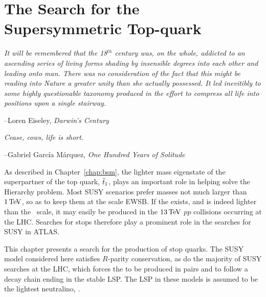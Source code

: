 \chapter{The Search for the Supersymmetric Top-quark}
\label{chap:search_stop}

\epigraph{
\textit{It will be remembered that the 18$^{th}$ century was, on the whole,
addicted to an ascending series of living forms shading by insensible degrees
into each other and leading onto man.
There was no consideration of the fact that this might be reading into Nature a greater
unity than she actually possessed. It led inevitibly to some highly
questionable taxonomy produced in the effort to compress all life into positions upon a
single stairway.}
}
{
--Loren Eiseley, \textit{Darwin's Century}
}

\epigraph{
\textit{Cease, cows, life is short.}
}
{
--Gabriel Garc\'{i}a M\'{a}rquez, \textit{One Hundred Years of Solitude}
}


As described in Chapter~\ref{chap:bsm}, the lighter mass eigenstate of the superpartner of
the top quark, $\tilde{t}_1$, plays an important role in helping solve the Hierarchy problem.
Most SUSY scenarios prefer \stopone masses not much larger than $1\,\text{Te\kern -0.1em V}$, so as to keep them
at the scale EWSB.
If the \stopone exists, and is indeed lighter than the \TeV~scale, it may easily be produced in the $13\,\text{Te\kern -0.1em V}$ $pp$ collisions
occurring at the LHC.
Searches for stops therefore play a prominent role in the searches for SUSY in ATLAS.

This chapter presents a search for the production of stop quarks.
The SUSY model considered here satisfies $R$-parity conservation, as do the majority of SUSY
searches at the LHC, which forces the \stopone to be produced in pairs and to follow
a decay chain ending in the stable LSP.
The LSP in these models is assumed to be the lightest neutralino, \ninoone.

